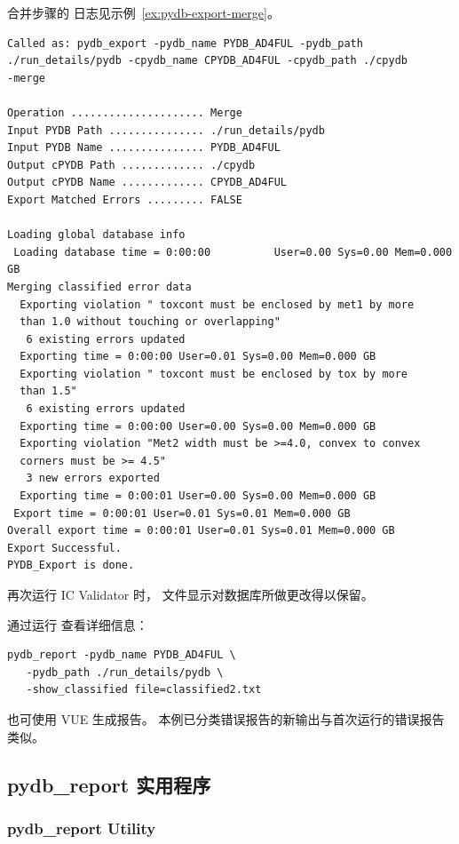 合并步骤的  日志见示例~\ref{ex:pydb-export-merge}。

\begin{lstlisting}[style=shell,caption={pydb\_export 日志文件},label={ex:pydb-export-merge}]
Called as: pydb_export -pydb_name PYDB_AD4FUL -pydb_path
./run_details/pydb -cpydb_name CPYDB_AD4FUL -cpydb_path ./cpydb
-merge

Operation ..................... Merge
Input PYDB Path ............... ./run_details/pydb
Input PYDB Name ............... PYDB_AD4FUL
Output cPYDB Path ............. ./cpydb
Output cPYDB Name ............. CPYDB_AD4FUL
Export Matched Errors ......... FALSE

Loading global database info
 Loading database time = 0:00:00          User=0.00 Sys=0.00 Mem=0.000 GB
Merging classified error data
  Exporting violation " toxcont must be enclosed by met1 by more
  than 1.0 without touching or overlapping"
   6 existing errors updated
  Exporting time = 0:00:00 User=0.01 Sys=0.00 Mem=0.000 GB
  Exporting violation " toxcont must be enclosed by tox by more
  than 1.5"
   6 existing errors updated
  Exporting time = 0:00:00 User=0.00 Sys=0.00 Mem=0.000 GB
  Exporting violation "Met2 width must be >=4.0, convex to convex
  corners must be >= 4.5"
   3 new errors exported
  Exporting time = 0:00:01 User=0.00 Sys=0.00 Mem=0.000 GB
 Export time = 0:00:01 User=0.01 Sys=0.01 Mem=0.000 GB
Overall export time = 0:00:01 User=0.01 Sys=0.01 Mem=0.000 GB
Export Successful.
PYDB_Export is done.
\end{lstlisting}

再次运行 IC Validator 时， 文件显示对数据库所做更改得以保留。

通过运行  查看详细信息：
\begin{lstlisting}[style=shell]
pydb_report -pydb_name PYDB_AD4FUL \
   -pydb_path ./run_details/pydb \
   -show_classified file=classified2.txt
\end{lstlisting}

也可使用 VUE 生成报告。
本例已分类错误报告的新输出与首次运行的错误报告类似。

\subsection{pydb\_report 实用程序}
\subsubsection*{pydb\_report Utility}


